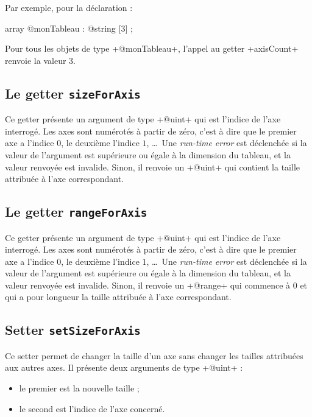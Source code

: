 Par exemple, pour la déclaration :
\begin{galgascode}
array @monTableau : @string [3] ;
\end{galgascode}
Pour tous les objets de type \ggs+@monTableau+, l'appel au getter \ggs+axisCount+ renvoie la valeur $3$.


\subsection{Le getter \texttt{sizeForAxis}}

Ce getter présente un argument de type \ggs+@uint+ qui est l'indice de l'axe interrogé. Les axes sont numérotés à partir de zéro, c'est à dire que le premier axe a l'indice $0$, le deuxième l'indice $1$, \dots~Une \emph{run-time error} est déclenchée si la valeur de l'argument est supérieure ou égale à la dimension du tableau, et la valeur renvoyée est invalide. Sinon, il renvoie un \ggs+@uint+ qui contient la taille attribuée à l'axe correspondant.


\subsection{Le getter \texttt{rangeForAxis}}

Ce getter présente un argument de type \ggs+@uint+ qui est l'indice de l'axe interrogé. Les axes sont numérotés à partir de zéro, c'est à dire que le premier axe a l'indice $0$, le deuxième l'indice $1$, \dots~Une \emph{run-time error} est déclenchée si la valeur de l'argument est supérieure ou égale à la dimension du tableau, et la valeur renvoyée est invalide. Sinon, il renvoie un \ggs+@range+ qui commence à $0$ et qui a pour longueur la taille attribuée à l'axe correspondant.




\subsection{Setter \texttt{setSizeForAxis}}

Ce setter permet de changer la taille d'un axe sans changer les tailles attribuées aux autres axes. Il présente deux arguments de type \ggs+@uint+ :
\begin{itemize}
  \item le premier est la nouvelle taille ;
  \item le second est l'indice de l'axe concerné.
\end{itemize}

